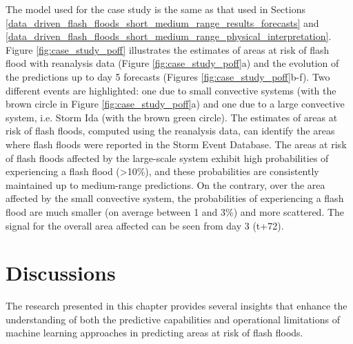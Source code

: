 \documentclass[nhess, manuscript]{copernicus}
\begin{document}
The model used for the case study is the same as that used in Sections \ref{data_driven_flash_floods_short_medium_range_results_forecasts} and \ref{data_driven_flash_floods_short_medium_range_physical_interpretation}. 
Figure \ref{fig:case_study_poff} illustrates the estimates of areas at risk of flash flood with reanalysis data (Figure \ref{fig:case_study_poff}a) and the evolution of the predictions up to day 5 forecasts (Figures \ref{fig:case_study_poff}b-f). Two different events are highlighted: one due to small convective systems (with the brown circle in Figure \ref{fig:case_study_poff}a) and one due to a large convective system, i.e. Storm Ida (with the brown green circle). The estimates of areas at risk of flash floods, computed using the reanalysis data, can identify the areas where flash floods were reported in the Storm Event Database. The areas at risk of flash floods affected by the large-scale system exhibit high probabilities of experiencing a flash flood (>10\%), and these probabilities are consistently maintained up to medium-range predictions. On the contrary, over the area affected by the small convective system, the probabilities of experiencing a flash flood are much smaller (on average between 1 and 3\%) and more scattered. The signal for the overall area affected can be seen from day 3 (t+72).


\section{Discussions}
\label{data_driven_flash_floods_short_medium_range_discussions}

The research presented in this chapter provides several insights that enhance the understanding of both the predictive capabilities and operational limitations of machine learning approaches in predicting areas at risk of flash floods. 
\end{document}
